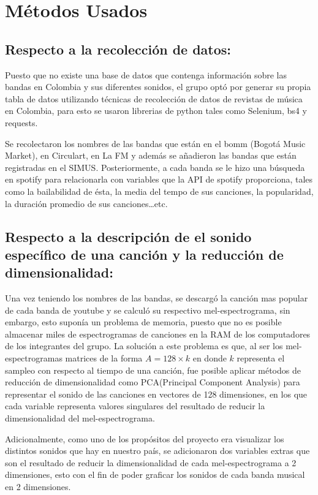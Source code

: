\documentclass[11pt]{article}
\begin{document}
\section{Métodos Usados}
\label{sec:org0142d18}
\subsection{Respecto a la recolección de datos:}
\label{sec:org9f53108}
Puesto que no existe una base de datos que contenga información sobre las bandas
en Colombia y sus diferentes sonidos, el grupo optó por generar su propia tabla
de datos utilizando técnicas de recolección de datos  de revistas de música en
Colombia, para esto se usaron librerias de python tales como Selenium, bs4 y
requests.

Se recolectaron los nombres de las bandas que están en el bomm (Bogotá Music
Market), en Circulart, en La FM y además se añadieron las bandas que están
registradas en el SIMUS. Posteriormente, a cada banda se le hizo una búsqueda en
spotify para relacionarla con variables que la API de spotify proporciona, tales
como la bailabilidad de ésta, la media del tempo de sus canciones, la
popularidad, la duración promedio de sus canciones\ldots{}etc.

\subsection{Respecto a la descripción de el sonido específico de una canción y la reducción de dimensionalidad:}
\label{sec:org22e0b38}
Una vez teniendo los nombres de las bandas, se descargó la canción mas popular
de cada banda de youtube y se calculó su respectivo mel-espectrograma, sin
embargo, esto suponía un problema de memoria, puesto que no es posible almacenar
miles de espectrogramas de canciones en la RAM de los computadores de los
integrantes del grupo. La solución a este problema es que, al ser los
mel-espectrogramas matrices de la forma \(A=128\times k\) en donde \(k\) representa
el sampleo con respecto al tiempo de una canción, fue posible aplicar métodos
de reducción de dimensionalidad como PCA(Principal Component Analysis) para
representar el sonido de las canciones en vectores de 128 dimensiones, en los
que cada variable representa valores singulares del resultado de reducir la
dimensionalidad del mel-espectrograma.

Adicionalmente, como uno de los propósitos del proyecto era visualizar los
distintos sonidos que hay en nuestro país, se adicionaron dos variables extras
que son el resultado de reducir la dimensionalidad de cada mel-espectrograma a 2
dimensiones, esto con el fin de poder graficar los sonidos de cada banda musical
en 2 dimensiones.
\end{document}
